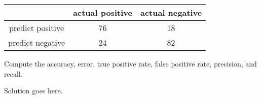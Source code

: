 \documentclass[a4paper]{article}
\theoremstyle{definition}
\newenvironment{soln}{
    \leavevmode\color{blue}\ignorespaces
}{}
\begin{document}
\begin{table}[H]
	\centering
		\begin{tabular}{ccc}
			& actual positive & actual negative \\
			\hline
			predict positive & 76 & 18\\
			\hline
			predict negative & 24 & 82\\
			\hline
		\end{tabular}
\end{table}

Compute the accuracy, error, true positive rate, false positive rate, precision, and recall. 

\begin{soln}  Solution goes here. \end{soln}





\end{document}
